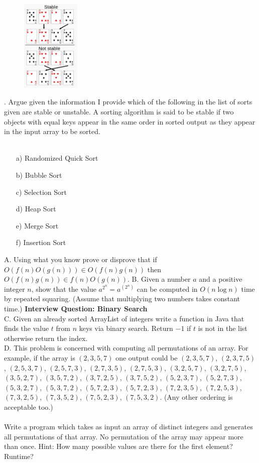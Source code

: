\documentclass[12pt]{article}
\begin{document}
\newpage
\begin{figure}
    \centering
    \includegraphics[width=0.25\textwidth]{ssort.jpg}
\end{figure}
. Argue given the information I provide which of the following in the list of sorts given are stable or unstable. A sorting algorithm is said to be stable if two objects with equal keys appear in the same order in sorted output as they appear in the input array to be sorted.\\\\
\begin{enumerate}
    \item[a)]Randomized Quick Sort
    \item[b)]Bubble Sort
    \item[c)]Selection Sort
    \item[d)]Heap Sort
    \item[e)]Merge Sort
    \item[f)]Insertion Sort
\end{enumerate}
\noindent A. Using what you know prove or disprove that if $O(f(n)O(g(n)))\in O(f(n)g(n))$ then $O(f(n)g(n)) \in f(n)O(g(n))$.
\newpage
\noindent B. Given a number $a$ and a positive integer $n$, show that the value $a^{2^n}=a^{(2^{n})}$ can be computed in $O(n\log{n})$ time by repeated squaring. (Assume that multiplying two numbers takes constant time.)
\newpage
\noindent\textbf{Interview Question: Binary Search}\\
\noindent C. Given an already sorted ArrayList of integers write a function in Java that finds the value $t$ from $n$ keys via binary search. Return $-1$ if $t$ is not in the list otherwise return the index.\\
\newpage
\noindent D. This problem is concerned with computing all permutations of an array. For example,
if the array is $(2,3,5, 7)$ one output could be $(2,3,5, 7)$, $(2,3,7,5)$, $(2,5,3, 7)$, $(2,5, 7,3)$,
$(2,7,3,5)$, $(2,7,5,3)$, $(3,2,5,7)$, $(3,2,7,5)$, $(3,5,2,7)$, $(3,5,7,2)$, $(3,7,2,5)$, $(3,7,5,2)$,
$(5, 2,3, 7)$, $(5,2,7,3)$, $(5,3,2,7)$, $(5,3,7,2)$, $(5,7,2,3)$, $(5,7,2,3)$, $(7,2,3,5)$, $(7,2,5,3)$,
$(7,3, 2,5)$, $(7,3,5, 2)$, $(7,5, 2,3)$, $(7,5,3, 2)$. (Any other ordering is acceptable too.)\\\\
Write a program which takes as input an array of distinct integers and generates all
permutations of that array. No permutation of the array may appear more than once.
Hint: How many possible values are there for the first element? Runtime?\\
\end{document}
